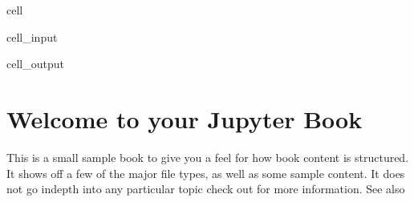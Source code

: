 \documentclass[letterpaper,10pt,english]{jupyterBook}
\begin{document}
\begin{sphinxuseclass}{cell}\begin{sphinxVerbatimInput}

\begin{sphinxuseclass}{cell_input}
\begin{sphinxVerbatim}[commandchars=\\\{\}]
 

\end{sphinxVerbatim}

\end{sphinxuseclass}\end{sphinxVerbatimInput}
\begin{sphinxVerbatimOutput}

\begin{sphinxuseclass}{cell_output}
\begin{sphinxVerbatim}[commandchars=\\\{\}]
[0, 6.928203230275509]
[\PYGZhy{}4.618802153517006, 9.237604307034012]
\end{sphinxVerbatim}

\noindent{}

\end{sphinxuseclass}\end{sphinxVerbatimOutput}

\end{sphinxuseclass}
\sphinxstepscope


\chapter{Welcome to your Jupyter Book}
\label{\detokenize{intro:welcome-to-your-jupyter-book}}\label{\detokenize{intro::doc}}
\sphinxAtStartPar
This is a small sample book to give you a feel for how book content is
structured.
It shows off a few of the major file types, as well as some sample content.
It does not go in\sphinxhyphen{}depth into any particular topic \sphinxhyphen{} check out  for more information. See also 
\end{document}
